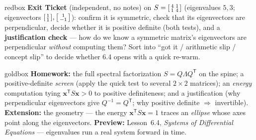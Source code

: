 \documentclass[10pt]{article}
\newcommand{\xx}{\mathbf{x}}
\newcommand{\T}{\mathsf{T}}
\begin{document}
\begin{skillbox}{redbox}
\textbf{Exit Ticket} (independent, no notes) on $S=\begin{bsmallmatrix}4&1\\1&4\end{bsmallmatrix}$
(eigenvalues $5,3$; eigenvectors $\begin{bsmallmatrix}1\\1\end{bsmallmatrix},\begin{bsmallmatrix}1\\-1\end{bsmallmatrix}$):
confirm it is symmetric, check that its eigenvectors are perpendicular, decide whether it is positive definite
(both tests), and a \textbf{justification check} --- how do we know a symmetric matrix's eigenvectors are
perpendicular \emph{without} computing them? Sort into ``got it / arithmetic slip / concept slip'' to decide
whether 6.4 opens with a quick re-warm.
\end{skillbox}

\begin{skillbox}{goldbox}
\textbf{Homework:} the full spectral factorization $S=Q\Lambda Q^{\T}$ on the spine; a positive-definite
\emph{screen} (apply the quick test to several $2\times2$ matrices); an \emph{energy} computation tying
$\xx^{\T}S\xx>0$ to positive definiteness; and a justification (why perpendicular eigenvectors give
$Q^{-1}=Q^{\T}$; why positive definite $\Rightarrow$ invertible). \textbf{Extension:} the geometry --- the
energy $\xx^{\T}S\xx=1$ traces an \emph{ellipse} whose axes point along the eigenvectors. \textbf{Preview:}
Lesson~6.4, \emph{Systems of Differential Equations} --- eigenvalues run a real system forward in time.
\end{skillbox}
\end{document}
